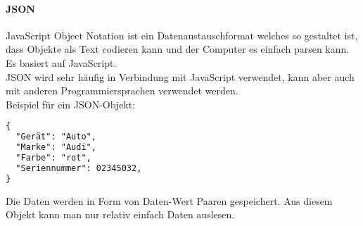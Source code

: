 \paragraph{JSON}
JavaScript Object Notation ist ein Datenaustauschformat welches so gestaltet ist, dass Objekte als Text codieren kann und der Computer es einfach parsen kann. Es basiert auf JavaScript.\\
JSON wird sehr häufig in Verbindung mit JavaScript verwendet, kann aber auch mit anderen Programmiersprachen verwendet werden.\\
Beispiel für ein JSON-Objekt:\\
\begin{lstlisting}[language=html]
{
  "Gerät": "Auto",
  "Marke": "Audi",
  "Farbe": "rot",
  "Seriennummer": 02345032,
}
\end{lstlisting}
Die Daten werden in Form von Daten-Wert Paaren gespeichert. Aus diesem Objekt kann man nur relativ einfach Daten auslesen.\\ 



